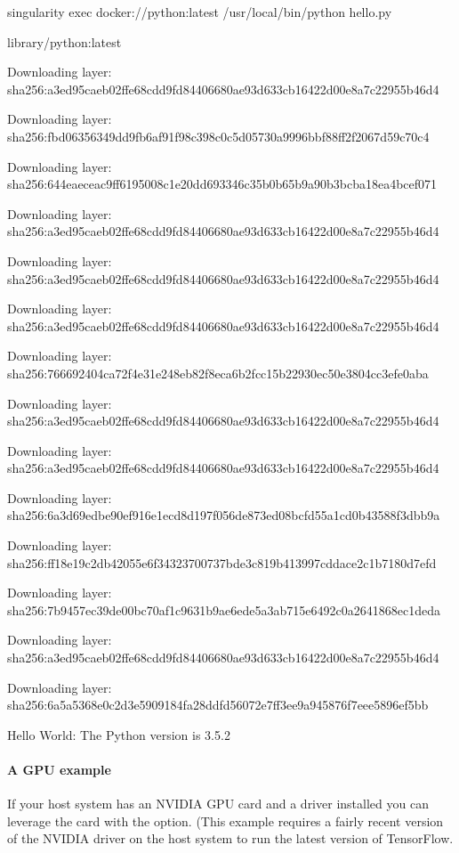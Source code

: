 \documentclass[letterpaper,10pt,english]{sphinxmanual}
\begin{document}
%
\begin{sphinxVerbatim}[commandchars=\\\{\}]
\PYGZdl{} singularity exec docker://python:latest /usr/local/bin/python hello.py

library/python:latest

Downloading layer: sha256:a3ed95caeb02ffe68cdd9fd84406680ae93d633cb16422d00e8a7c22955b46d4

Downloading layer: sha256:fbd06356349dd9fb6af91f98c398c0c5d05730a9996bbf88ff2f2067d59c70c4

Downloading layer: sha256:644eaeceac9ff6195008c1e20dd693346c35b0b65b9a90b3bcba18ea4bcef071

Downloading layer: sha256:a3ed95caeb02ffe68cdd9fd84406680ae93d633cb16422d00e8a7c22955b46d4

Downloading layer: sha256:a3ed95caeb02ffe68cdd9fd84406680ae93d633cb16422d00e8a7c22955b46d4

Downloading layer: sha256:a3ed95caeb02ffe68cdd9fd84406680ae93d633cb16422d00e8a7c22955b46d4

Downloading layer: sha256:766692404ca72f4e31e248eb82f8eca6b2fcc15b22930ec50e3804cc3efe0aba

Downloading layer: sha256:a3ed95caeb02ffe68cdd9fd84406680ae93d633cb16422d00e8a7c22955b46d4

Downloading layer: sha256:a3ed95caeb02ffe68cdd9fd84406680ae93d633cb16422d00e8a7c22955b46d4

Downloading layer: sha256:6a3d69edbe90ef916e1ecd8d197f056de873ed08bcfd55a1cd0b43588f3dbb9a

Downloading layer: sha256:ff18e19c2db42055e6f34323700737bde3c819b413997cddace2c1b7180d7efd

Downloading layer: sha256:7b9457ec39de00bc70af1c9631b9ae6ede5a3ab715e6492c0a2641868ec1deda

Downloading layer: sha256:a3ed95caeb02ffe68cdd9fd84406680ae93d633cb16422d00e8a7c22955b46d4

Downloading layer: sha256:6a5a5368e0c2d3e5909184fa28ddfd56072e7ff3ee9a945876f7eee5896ef5bb

Hello World: The Python version is 3.5.2
\end{sphinxVerbatim}


\paragraph{A GPU example}
\label{\detokenize{appendix:a-gpu-example}}
If your host system has an NVIDIA GPU card and a driver installed you
can leverage the card with the  option. (This example requires a fairly
recent version of the NVIDIA driver on the host system to run the latest
version of TensorFlow.
\end{document}
